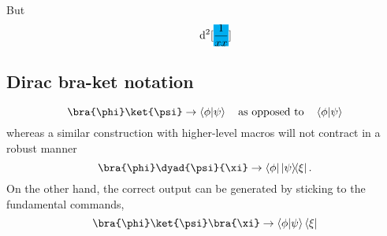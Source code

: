 \documentclass{article}
\def\phantom#1{#1}
\newcommand{\cbox}[2][cyan]
{\mathchoice
	{\setlength{\fboxsep}{0pt}\colorbox{#1}{$\displaystyle#2$}}
	{\setlength{\fboxsep}{0pt}\colorbox{#1}{$\textstyle#2$}}
	{\setlength{\fboxsep}{0pt}\colorbox{#1}{$\scriptstyle#2$}}
	{\setlength{\fboxsep}{0pt}\colorbox{#1}{$\scriptscriptstyle#2$}}
}
\newcommand{\grande}{\cbox{\phantom{\frac{1}{xx}}}}
\begin{document}
But
 \[
   \qquad \dd[2][\grande]
\]


\subsection{Dirac bra-ket notation}
\begin{displaymath}
\verb|\bra{\phi}\ket{\psi}| \rightarrow \bra{\phi}\ket{\psi} \qq{as opposed to} \bra{\phi} \ket{\psi}
\end{displaymath}
whereas a similar construction with higher-level macros will not contract in a robust manner
\begin{displaymath}
\verb|\bra{\phi}\dyad{\psi}{\xi}| \rightarrow \bra{\phi}\dyad{\psi}{\xi}.
\end{displaymath}
On the other hand, the correct output can be generated by sticking to the fundamental commands,
\begin{displaymath}
\verb|\bra{\phi}\ket{\psi}\bra{\xi}| \rightarrow \bra{\phi}\ket{\psi}\bra{\xi}
\end{displaymath}
\end{document}
